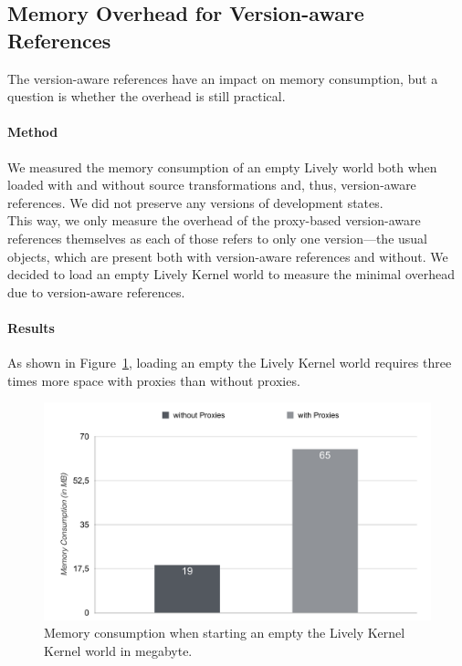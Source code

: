 \subsection{Memory Overhead for Version-aware References}

The version-aware references have an impact on memory consumption, but a question is whether the overhead is still practical.

\paragraph{Method}
We measured the memory consumption of an empty Lively world both when loaded with and without source transformations and, thus, version-aware references.
We did not preserve any versions of development states.\\
This way, we only measure the overhead of the proxy-based version-aware references themselves as each of those refers to only one version---the usual objects, which are present both with version-aware references and without.
We decided to load an empty Lively Kernel world to measure the minimal overhead due to version-aware references.


\paragraph{Results}
As shown in Figure~\ref{fig:MemoryOverheadForReferences}, loading an empty the Lively Kernel world requires three times more space with proxies than without proxies.

\begin{figure}[h]
    \centering
    \includegraphics[width=\textwidth]{figures/6_evaluation/1_memoryOverhead.pdf}
    \caption{Memory consumption when starting an empty the Lively Kernel Kernel world in megabyte.}
    \label{fig:MemoryOverheadForReferences}
\end{figure}

